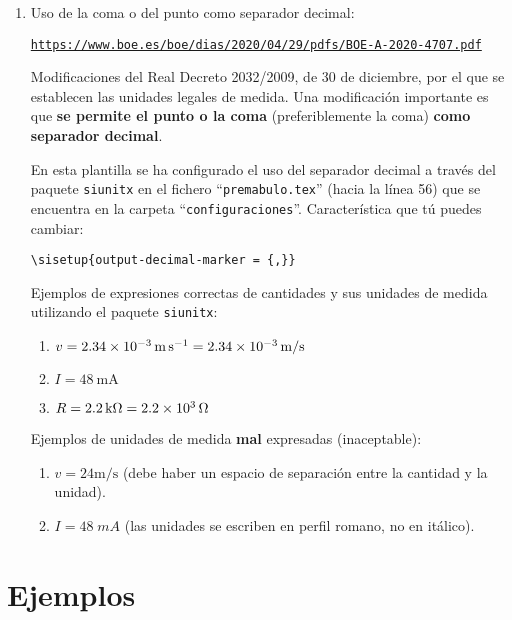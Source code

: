 \documentclass[11pt]{article}
\begin{document}
\begin{enumerate}
	\item Uso de la coma o del punto como separador decimal:
	
    \texttt{\url{https://www.boe.es/boe/dias/2020/04/29/pdfs/BOE-A-2020-4707.pdf}}
    
    Modificaciones del Real Decreto 2032/2009, de 30 de diciembre, por el que se establecen las unidades legales de medida. Una modificación importante es que \textbf{se permite el punto o la coma} (preferiblemente la coma) \textbf{como separador decimal}.
	
	En esta plantilla se ha configurado el uso del separador decimal a través del paquete \texttt{siunitx} en el fichero ``\texttt{premabulo.tex}'' (hacia la línea 56)  que se encuentra en la carpeta ``\texttt{configuraciones}''. Característica que tú puedes cambiar:
	
	\verb|\sisetup{output-decimal-marker = {,}}|
	
	Ejemplos de expresiones correctas de cantidades y sus unidades de medida utilizando el paquete \texttt{siunitx}:
	
    \begin{enumerate}
        \item $v = \qty{2.34E-3}{\meter\per\second} = \qty[per-mode=symbol]{2.34E-3}{\meter\per\second}$
        \item $I = \qty{48}{\milli\ampere}$
        \item $R = \qty{2.2}{\kilo\ohm} = \qty{2.2E3}{\ohm}$
    \end{enumerate}
	
	\medskip
	
	Ejemplos de unidades de medida \textbf{mal} expresadas (inaceptable):
	\begin{enumerate}
	    \item $v = 24\mathrm{m/s}$ (debe haber un espacio de separación entre la cantidad y la unidad).
	    \item $I = 48\;mA$ (las unidades se escriben en perfil romano, no en itálico).
	\end{enumerate}

\end{enumerate}


\section{Ejemplos}
\label{sec:ejemplos}
\end{document}

